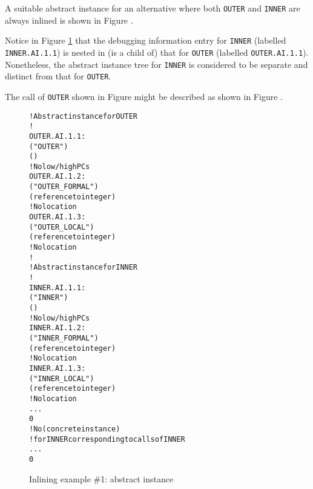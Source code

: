 A suitable abstract instance for an alternative where both
\texttt{OUTER} and \texttt{INNER} are always inlined is shown in 
Figure .

Notice in 
Figure \ref{fig:inliningexample1abstractinstance} 
that the debugging information entry for
\texttt{INNER} (labelled \texttt{INNER.AI.1.1}) is nested in (is a child of)
that for \texttt{OUTER} (labelled \texttt{OUTER.AI.1.1}). Nonetheless, the
abstract instance tree for \texttt{INNER} is considered to be separate
and distinct from that for \texttt{OUTER}.

The call of \texttt{OUTER} shown in 
Figure 
might be described as
shown in 
Figure .


\begin{figure}[p]
\begin{dwflisting}
\begin{alltt}
    ! Abstract instance for OUTER
    ! 
OUTER.AI.1.1:
    \DWTAGsubprogram
        \DWATname("OUTER")
        \DWATinline(\DWINLdeclaredinlined)
        ! No low/high PCs
OUTER.AI.1.2:
        \DWTAGformalparameter
            \DWATname("OUTER\_FORMAL")
            \DWATtype(reference to integer)
            ! No location
OUTER.AI.1.3:
        \DWTAGvariable
            \DWATname("OUTER\_LOCAL")
            \DWATtype(reference to integer)
            ! No location
        !
        ! Abstract instance for INNER
        !
INNER.AI.1.1:
        \DWTAGsubprogram
            \DWATname("INNER")
            \DWATinline(\DWINLdeclaredinlined)
            ! No low/high PCs
INNER.AI.1.2:
            \DWTAGformalparameter
                \DWATname("INNER\_FORMAL")
                \DWATtype(reference to integer)
                ! No location
INNER.AI.1.3:
            \DWTAGvariable
                \DWATname("INNER\_LOCAL")
                \DWATtype(reference to integer)
                ! No location
            ...
            0
        ! No \DWTAGinlinedsubroutine (concrete instance)
        ! for INNER corresponding to calls of INNER
        ...
        0
\end{alltt}
\end{dwflisting}
\caption{Inlining example \#1: abstract instance}
\label{fig:inliningexample1abstractinstance}
\end{figure}

